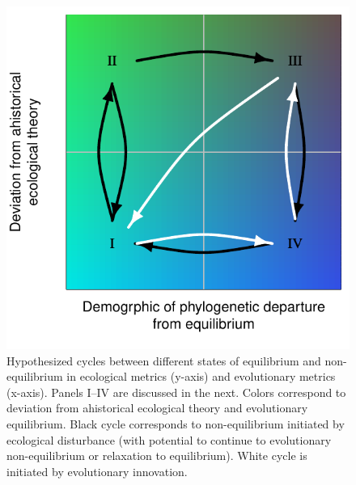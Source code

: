 \documentclass[12pt]{article}
\begin{document}
\begin{figure}[!hbp]
  \centering
  \includegraphics[scale=1]{fig_cycles.pdf}
  \caption{Hypothesized cycles between different states of equilibrium
    and non-equilibrium in ecological metrics (y-axis) and
    evolutionary metrics (x-axis). Panels I--IV are discussed in the
    next.  Colors correspond to deviation from ahistorical ecological
    theory and evolutionary equilibrium.  Black cycle corresponds to
    non-equilibrium initiated by ecological disturbance (with
    potential to continue to evolutionary non-equilibrium or
    relaxation to equilibrium). White cycle is initiated by
    evolutionary innovation.}
  \label{fig:cycles}
\end{figure}
\end{document}
